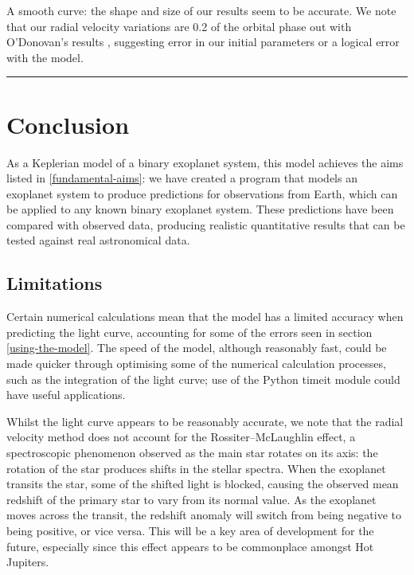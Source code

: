\documentclass[11pt]{article}
\begin{document}
A smooth curve: the shape and size of our results seem to be accurate.
We note that our radial velocity variations are 0.2 of the orbital phase
out with O'Donovan's results \parencite*{O_Donovan}, suggesting error in our initial parameters
or a logical error with the model.

\begin{center}\rule{0.5\linewidth}{0.5pt}\end{center}

    \hypertarget{conclusion}{%
\section{Conclusion}\label{conclusion}}

As a Keplerian model of a binary exoplanet system, this model achieves
the aims listed in \ref{fundamental-aims}: we have created a program that models an exoplanet system to produce predictions for observations from Earth, which can be applied to any known binary exoplanet system. These predictions have been compared with observed data, producing realistic quantitative results that can be tested against real astronomical data.

\hypertarget{limitations}{%
\subsection{Limitations}\label{limitations}}

Certain numerical calculations mean that the model has a limited
accuracy when predicting the light curve, accounting for some of the
errors seen in section \ref{using-the-model}. The speed of the model, although reasonably fast, could be made quicker through optimising some of the numerical
calculation processes, such as the integration of the light curve; use of the Python timeit module could have useful applications.

Whilst the light curve appears to be reasonably accurate, we note that
the radial velocity method does not account for the Rossiter--McLaughlin
effect, a spectroscopic phenomenon observed as the main star rotates on
its axis: the rotation of the star produces shifts in the stellar
spectra. When the exoplanet transits the star, some of the shifted light
is blocked, causing the observed mean redshift of the primary star to
vary from its normal value. As the exoplanet moves across the transit,
the redshift anomaly will switch from being negative to being positive,
or vice versa. This will be a key area of development for the future,
especially since this effect appears to be commonplace amongst Hot
Jupiters.
\end{document}
